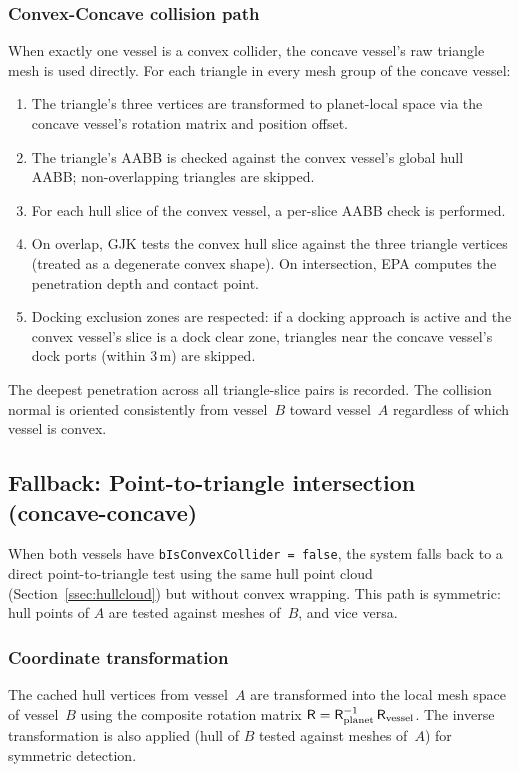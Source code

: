 \documentclass[Orbiter Technical Reference.tex]{subfiles}
\begin{document}
\subsubsection{Convex-Concave collision path}
\label{ssec:convex_concave}
When exactly one vessel is a convex collider, the concave vessel's raw
triangle mesh is used directly.  For each triangle in every mesh group
of the concave vessel:

\begin{enumerate}
\item The triangle's three vertices are transformed to planet-local
  space via the concave vessel's rotation matrix and position offset.
\item The triangle's AABB is checked against the convex vessel's global
  hull AABB; non-overlapping triangles are skipped.
\item For each hull slice of the convex vessel, a per-slice AABB check
  is performed.
\item On overlap, GJK tests the convex hull slice against the three
  triangle vertices (treated as a degenerate convex shape).  On
  intersection, EPA computes the penetration depth and contact point.
\item Docking exclusion zones are respected: if a docking approach is
  active and the convex vessel's slice is a dock clear zone, triangles
  near the concave vessel's dock ports (within 3\,m) are skipped.
\end{enumerate}

The deepest penetration across all triangle-slice pairs is recorded.
The collision normal is oriented consistently from vessel~$B$ toward
vessel~$A$ regardless of which vessel is convex.


\subsection{Fallback: Point-to-triangle intersection (concave-concave)}
\label{ssec:narrowphase_legacy}
When both vessels have \texttt{bIsConvexCollider = false}, the system
falls back to a direct point-to-triangle test using the same hull point
cloud (Section~\ref{ssec:hullcloud}) but without convex wrapping.
This path is symmetric: hull points of $A$ are tested against meshes
of~$B$, and vice versa.

\subsubsection{Coordinate transformation}
The cached hull vertices from vessel~$A$ are transformed into the local
mesh space of vessel~$B$ using the composite rotation matrix
$\mathsf{R} = \mathsf{R}_{\mathrm{planet}}^{-1}\,\mathsf{R}_{\mathrm{vessel}}$.
The inverse transformation is also applied (hull of $B$ tested against
meshes of~$A$) for symmetric detection.
\end{document}

